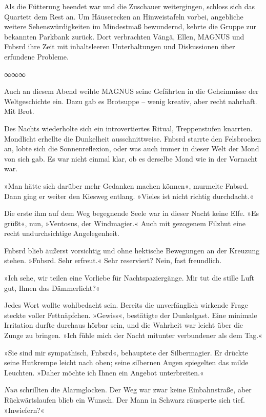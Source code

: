 Als die Fütterung beendet war und die Zuschauer weitergingen, schloss sich das Quartett dem Rest an. Um Häuserecken an Hinweistafeln vorbei, angebliche weitere Sehenswürdigkeiten im Mindestmaß bewundernd, kehrte die Gruppe zur bekannten Parkbank zurück. Dort verbrachten Vängä, Ellen, MAGNUS und Fnbsrd ihre Zeit mit inhaltsleeren Unterhaltungen und Diskussionen über erfundene Probleme.

\begin{center}
∞∞∞
\end{center}

Auch an diesem Abend weihte MAGNUS seine Gefährten in die Geheimnisse der Weltgeschichte ein. Dazu gab es Brotsuppe – wenig kreativ, aber recht nahrhaft. Mit Brot.

Des Nachts wiederholte sich ein introvertiertes Ritual, Treppenstufen knarrten. Mondlicht erhellte die Dunkelheit ausschnittweise. Fnbsrd starrte den Felsbrocken an, lobte sich die Sonnenreflexion, oder was auch immer in dieser Welt der Mond von sich gab. Es war nicht einmal klar, ob es derselbe Mond wie in der Vornacht war.

»Man hätte sich darüber mehr Gedanken machen können«, murmelte Fnbsrd. Dann ging er weiter den Kiesweg entlang. »Vieles ist nicht richtig durchdacht.«

Die erste ihm auf dem Weg begegnende Seele war in dieser Nacht keine Elfe. »Es grüßt«, nun, »Ventosus, der Windmagier.« Auch mit gezogenem Filzhut eine recht undurchsichtige Angelegenheit.

Fnbsrd blieb äußerst vorsichtig und ohne hektische Bewegungen an der Kreuzung stehen. »Fnbsrd. Sehr erfreut.« Sehr reserviert? Nein, fast freundlich.

»Ich sehe, wir teilen eine Vorliebe für Nachtspaziergänge. Mir tut die stille Luft gut, Ihnen das Dämmerlicht?«

Jedes Wort wollte wohlbedacht sein. Bereits die unverfänglich wirkende Frage steckte voller Fettnäpfchen. »Gewiss«, bestätigte der Dunkelgast. Eine minimale Irritation durfte durchaus hörbar sein, und die Wahrheit war leicht über die Zunge zu bringen. »Ich fühle mich der Nacht mitunter verbundener als dem Tag.«

»Sie sind mir sympathisch, Fnbsrd«, behauptete der Silbermagier. Er drückte seine Hutkrempe leicht nach oben; seine silbernen Augen spiegelten das milde Leuchten. »Daher möchte ich Ihnen ein Angebot unterbreiten.«

\emph{Nun} schrillten die Alarmglocken. Der Weg war zwar keine Einbahnstraße, aber Rückwärtslaufen blieb ein Wunsch. Der Mann in Schwarz räusperte sich tief. »Inwiefern?«

